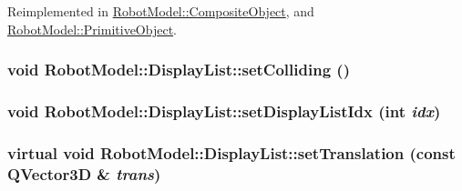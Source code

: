 Reimplemented in \hyperlink{class_robot_model_1_1_composite_object_a12e8961ebc63d8a253d915b29b356162}{RobotModel::CompositeObject}, and \hyperlink{class_robot_model_1_1_primitive_object_a0a7cfefb126e4f37c208c516f8ffd9bb}{RobotModel::PrimitiveObject}.\hypertarget{class_robot_model_1_1_display_list_aab3355867d2a992c208f2173fc29e221}{
\subsubsection[{setColliding}]{\setlength{\rightskip}{0pt plus 5cm}void RobotModel::DisplayList::setColliding ()}}
\label{class_robot_model_1_1_display_list_aab3355867d2a992c208f2173fc29e221}
\hypertarget{class_robot_model_1_1_display_list_a78c642f12487ea830475a0e860aeee38}{
\subsubsection[{setDisplayListIdx}]{\setlength{\rightskip}{0pt plus 5cm}void RobotModel::DisplayList::setDisplayListIdx (int {\em idx})}}
\label{class_robot_model_1_1_display_list_a78c642f12487ea830475a0e860aeee38}
\hypertarget{class_robot_model_1_1_display_list_a6c9c1298e237ab25037ad9d7163b118c}{
\subsubsection[{setTranslation}]{\setlength{\rightskip}{0pt plus 5cm}virtual void RobotModel::DisplayList::setTranslation (const QVector3D \& {\em trans})}}
\label{class_robot_model_1_1_display_list_a6c9c1298e237ab25037ad9d7163b118c}


